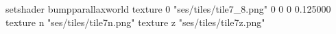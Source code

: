 setshader bumpparallaxworld
texture 0 "ses/tiles/tile7_8.png" 0 0 0 0.125000
texture n "ses/tiles/tile7n.png"
texture z "ses/tiles/tile7z.png"

